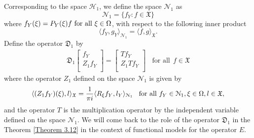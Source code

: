 \documentclass [12pt,reqno]{amsart}
\numberwithin{equation}{subsection}
\numberwithin{equation}{section}
\begin{document}
Corresponding to the space $\mathcal{H}_1$, we define the space $\mathcal{N}_1$ as 
\begin{equation}\label{Equation 3.24}
\mathcal{N}_1= \{f_Y : f \in \mathfrak{X} \}
\end{equation}
where \(f_Y(\xi) = P_Y(\xi)f$ for all $\xi \in \Omega\), with respect to the following inner product
\begin{equation} \label{Equation 3.25}
\langle f_Y, g_Y \rangle_{\mathcal{N}_1} = \langle f, g \rangle_{\mathfrak{X}}.
\end{equation}
Define the operator $\mathfrak{D}_1$ by \begin{eqnarray} \label{Equation 3.26}
\mathfrak{D}_1\begin{bmatrix} 
                       	f_Y  \\
                    	Z_1f_Y \\
                    	\end{bmatrix}   = \begin{bmatrix} 
                       	                  Tf_Y  \\
                    	                  Z_1Tf_Y \\
                    	                   \end{bmatrix} ~~~~\mbox{for all}~~ f \in \mathfrak{X} 
\end{eqnarray} where the operator $Z_1$ defined on the space $\mathcal{N}_1$ is given by 
 \begin{equation}
 \langle (Z_1f_Y)(\xi), l \rangle_{\mathfrak{X}}= \frac{1}{\pi i}\langle R_{\xi}f_Y, l_Y \rangle _{\mathcal{N}_1}
\hspace{0.3cm} \text{for all}~ f_Y \in \mathcal{N}_1, \xi \in \Omega, l \in \mathfrak{X},
\end{equation} 
and the operator $T$ is the multiplication operator by the independent variable defined on the space $\mathcal{N}_1$.
We will come back to the role of the operator $\mathfrak{D}_1$ in the Theorem \ref{Theorem 3.12} in the context of functional models for the operator $E$.
\end{document}
